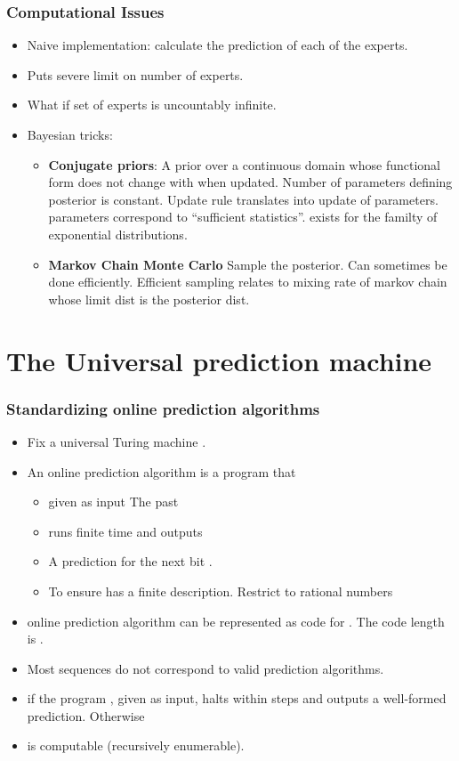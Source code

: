 \documentclass[handout]{beamer}
\begin{document}
\begin{frame}
\frametitle{Computational Issues}
\begin{itemize}
\item Naive implementation: calculate the prediction of each of 
the  experts.
\item Puts severe limit on number of experts.
\item What if set of experts is uncountably infinite.
\item Bayesian tricks:
\begin{itemize}
\item {\bf Conjugate priors}: A prior over a continuous domain whose functional form does not change with when updated. 
\pause Number of parameters defining posterior is constant. 
\pause Update rule translates into update of parameters.
\pause parameters correspond to ``sufficient statistics''.
\pause exists for the familty of exponential distributions.
\item {\bf Markov Chain Monte Carlo} Sample the posterior. 
\pause Can sometimes be done efficiently.
\pause Efficient sampling relates to mixing rate of markov chain whose limit dist is the posterior dist. 
\end{itemize}
\end{itemize}
\end{frame}

\section{The Universal prediction machine}

\begin{frame}
\frametitle{Standardizing online prediction algorithms}
\begin{itemize}
\item Fix a universal Turing machine .
\item An online prediction algorithm  is a program that 
\begin{itemize}
\item
given as input {\color{blue} The past} 
\item runs finite time and outputs
\item
A prediction for the next bit .
\item 
To ensure  has a finite description. Restrict to {\color{blue}rational} numbers 
\end{itemize}

\item {} online prediction algorithm can be represented as code 
for . The code length is .
\item Most sequences do not correspond to valid prediction algorithms. 
\item 
{} if the program \R{$\vb$}, given \R{$\X$} as input, 
halts within  steps and outputs a well-formed prediction. Otherwise 
\item {} is computable (recursively enumerable).
\end{itemize}
\end{frame}
\end{document}
